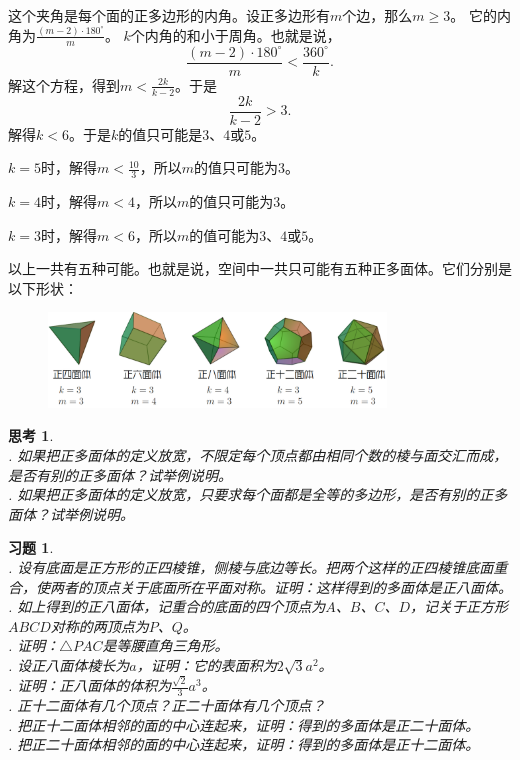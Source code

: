\documentclass[12pt,UTF8]{ctexbook}
\newtheorem{sk}{思考}[section]
\newtheorem{xt}{习题}[section]
\begin{document}
这个夹角是每个面的正多边形的内角。设正多边形有$m$个边，那么$m \geqslant 3$。
它的内角为$\frac{(m - 2)\cdot 180^\circ}{m}$。
$k$个内角的和小于周角。也就是说，
$$ \frac{(m - 2)\cdot 180^\circ}{m} < \frac{360^\circ}{k}.$$
解这个方程，得到$m < \frac{2k}{k - 2}$。于是
$$ \frac{2k}{k - 2} > 3.$$
解得$k < 6$。于是$k$的值只可能是$3$、$4$或$5$。

$k = 5$时，解得$m < \frac{10}{3}$，所以$m$的值只可能为$3$。

$k = 4$时，解得$m < 4$，所以$m$的值只可能为$3$。

$k = 3$时，解得$m < 6$，所以$m$的值可能为$3$、$4$或$5$。

以上一共有五种可能。也就是说，空间中一共只可能有五种正多面体。它们分别是以下形状：

\begin{figure}[h]
    \vspace{4pt}
    \centering
    \includegraphics[width=0.8\textwidth]{正多面体1.png}
    \captionsetup{justification=centering}
\end{figure}

\begin{sk}
    \mbox{}\\
    . 如果把正多面体的定义放宽，不限定每个顶点都由相同个数的棱与面交汇而成，是否有别的正多面体？试举例说明。\\
    . 如果把正多面体的定义放宽，只要求每个面都是全等的多边形，是否有别的正多面体？试举例说明。
\end{sk}

\begin{xt}
    \mbox{}\\
    . 设有底面是正方形的正四棱锥，侧棱与底边等长。把两个这样的正四棱锥底面重合，使两者的顶点关于底面所在平面对称。证明：这样得到的多面体是正八面体。\\
    . 如上得到的正八面体，记重合的底面的四个顶点为$A$、$B$、$C$、$D$，记关于正方形$ABCD$对称的两顶点为$P$、$Q$。\\
    . 证明：$\triangle PAC$是等腰直角三角形。\\
    . 设正八面体棱长为$a$，证明：它的表面积为$2\sqrt{3}a^2$。\\
    . 证明：正八面体的体积为$\frac{\sqrt{2}}{3}a^3$。\\
    . 正十二面体有几个顶点？正二十面体有几个顶点？\\
    . 把正十二面体相邻的面的中心连起来，证明：得到的多面体是正二十面体。\\
    . 把正二十面体相邻的面的中心连起来，证明：得到的多面体是正十二面体。
\end{xt}
\end{document}
